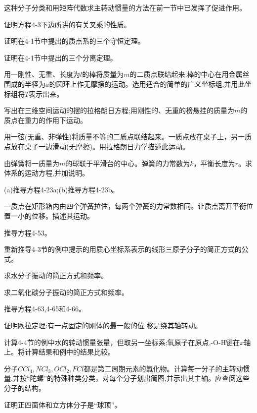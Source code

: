 这种分子分类和用矩阵代数求主转动惯量的方法在前一节中已发挥了促进作用。

\begin{problemset}
\item 证明方程4-3下边所讲的有关叉乘的性质。
\item 证明在4-1节中提出的质点系的三个守恒定理。
\item 证明在4-1节中提出的三个分离定理。
\item 用一刚性、无重、长度为$l$的棒将质量为$m$的二质点联结起来;棒的中心在用金属丝围成的半径为$a$的圆环上作无摩擦的运动。选用适合的简单的广义坐标组,并用此坐标组将$T$表示出来。
\item 写出在三维空间运动的摆的拉格朗日方程;用刚性的、无重的榜悬挂的质量为$m$的质点在重力的作用下运动。
\item 用一弦(无重、非弹性)将质量不等的二质点联结起来。一质点放在桌子上，另一质点放在桌子一边滑动(无摩擦)。用拉格朗日力学描述此运动。
\item 由弹簧将一质量为$m$的球联于平滑台的中心。弹簧的力常数为$k$，平衡长度为$r$。求体系的运动方程,并加说明。
\item  (a)推导方程4-23a;(b)推导方程4-23b。
\item 一质点在矩形箱内由四个弹簧拉住，每两个弹簧的力常数相同。让质点离开平衡位置一小的位移。描述其运动。
\item 推导方程4-53。
\item 重新推导4-3节的例中提示的用质心坐标系表示的线形三原子分子的简正方式的公式。
\item 求水分子振动的简正方式和频率。
\item 求二氧化碳分子振动的简正方式和频率。
\item 推导方程4-63,4-65和4-66。
\item 证明欧拉定理:有一点固定的刚体的最一般的位 移是绕其轴转动。
\item 计算4-4节的例中水的转动惯量张量，但取另一坐标系;氧原子在原点,-O-H键在$x$轴上。将计算结果和例中的结果比较。
\item 分子$CCl_4, NCl_3,OCl_2,FCl$都是第二周期元素的氯化物。计算每一分子的主转动惯量,并按“陀螺”的特殊种类分类，对每个分子划出简图,并示出其主轴。应查阅这些分子的结构。
\item 证明正四面体和立方体分子是“球顶”。
\end{problemset}